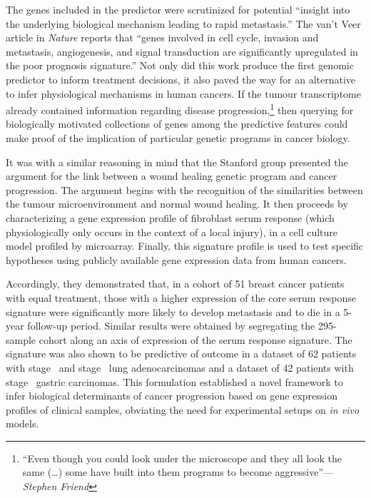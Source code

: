 The genes included in the predictor were scrutinized for potential ``insight
into the underlying biological mechanism leading to rapid metastasis.''  The
van't Veer article in \emph{Nature} reports that ``genes involved in cell cycle,
invasion and metastasis, angiogenesis, and signal transduction are significantly
upregulated in the poor prognosis signature.''  Not only did this work produce
the first genomic predictor to inform treatment decisions, it also paved the way
for an alternative to infer physiological mechanisms in human cancers.  If the
tumour transcriptome already contained information regarding disease
progression,\footnote{``Even though you could look under the microscope and they
  all look the same (\ldots{}) some have built into them programs to become
  aggressive''---\emph{Stephen Friend}} then querying for biologically motivated
collections of genes among the predictive features could make proof of the
implication of particular genetic programs in cancer biology.


It was with a similar reasoning in mind that the Stanford group presented the
argument for the link between a wound healing genetic program and cancer
progression.\cite{chang_gene_2004} The argument begins with the recognition of
the similarities between the tumour microenvironment and normal wound healing.
It then proceeds by characterizing a gene expression profile of fibroblast serum
response (which physiologically only occurs in the context of a local injury),
in a cell culture model profiled by microarray.  Finally, this signature profile
is used to test specific hypotheses using publicly available gene expression
data from human cancers.

Accordingly, they demonstrated that, in a cohort of 51 breast cancer patients
with equal treatment, those with a higher expression of the core serum response
signature were significantly more likely to develop metastasis and to die in a
\mbox{5-year} \mbox{follow-up} period.  Similar results were obtained by
segregating the \mbox{295-sample}  cohort along an axis of
expression of the serum response signature.  The signature was also shown to be
predictive of outcome in a dataset of 62 patients with \mbox{stage
  } and \mbox{stage } lung
adenocarcinomas\cite{garber_diversity_2001} and a dataset of 42 patients with
\mbox{stage } gastric carcinomas.\cite{leung_phospholipase_2002}
This formulation established a novel framework to infer biological determinants
of cancer progression based on gene expression profiles of clinical samples,
obviating the need for experimental setups on \emph{in vivo} models.

